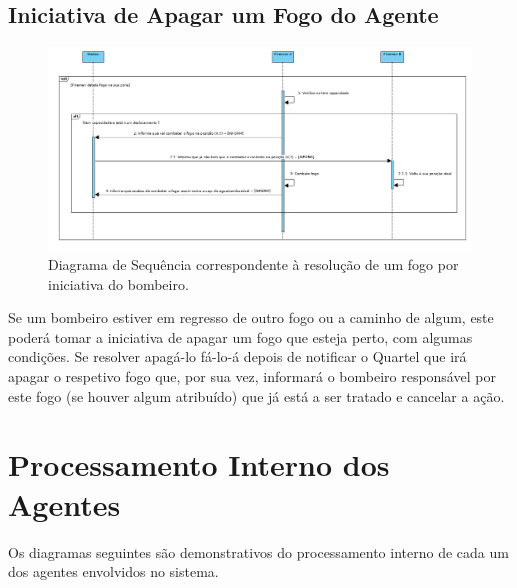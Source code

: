 \documentclass[a4paper]{article}
\begin{document}
\subsection{Iniciativa de Apagar um Fogo do Agente}
\begin{figure}[!h]
    \centering
    \includegraphics[scale=0.3]{ResolverFogoACaminho_V4.png}
    \caption{Diagrama de Sequência correspondente à resolução de um fogo por iniciativa do bombeiro.}
\end{figure}
Se um bombeiro estiver em regresso de outro fogo ou a caminho de algum, este poderá tomar a iniciativa de apagar um fogo que esteja perto, com algumas condições. Se resolver apagá-lo fá-lo-á depois de notificar o Quartel que irá apagar o respetivo fogo que, por sua vez, informará o bombeiro responsável por este fogo (se houver algum atribuído) que já está a ser tratado e cancelar a ação.

\pagebreak
\section{Processamento Interno dos Agentes}

Os diagramas seguintes são demonstrativos do processamento interno de cada um dos agentes envolvidos no sistema.
\end{document}

